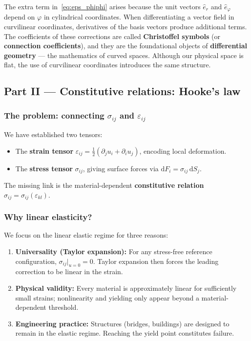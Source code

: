 \begin{remark}
    The extra term in~\eqref{eq:eps_phiphi} arises because the unit vectors $\hat{e}_r$ and $\hat{e}_\varphi$ depend on $\varphi$ in cylindrical coordinates. When differentiating a vector field in curvilinear coordinates, derivatives of the basis vectors produce additional terms. The coefficients of these corrections are called \textbf{Christoffel symbols} (or \textbf{connection coefficients}), and they are the foundational objects of \textbf{differential geometry} — the mathematics of curved spaces. Although our physical space is flat, the use of curvilinear coordinates introduces the same structure.
\end{remark}

\subsection*{Part II — Constitutive relations: Hooke's law}

\subsubsection*{The problem: connecting $\sigma_{ij}$ and $\varepsilon_{ij}$}

We have established two tensors:
\begin{itemize}
    \item The \textbf{strain tensor} $\varepsilon_{ij} = \tfrac{1}{2}(\partial_j u_i + \partial_i u_j)$, encoding local deformation.
    \item The \textbf{stress tensor} $\sigma_{ij}$, giving surface forces via $\mathrm{d}F_i = \sigma_{ij}\,\mathrm{d}S_j$.
\end{itemize}
The missing link is the material-dependent \textbf{constitutive relation} $\sigma_{ij} = \sigma_{ij}(\varepsilon_{kl})$.

\subsubsection*{Why linear elasticity?}

We focus on the linear elastic regime for three reasons:

\begin{enumerate}
    \item \textbf{Universality (Taylor expansion):} For any stress-free reference configuration, $\sigma_{ij}\big|_{u=0}=0$. Taylor expansion then forces the leading correction to be linear in the strain.
    \item \textbf{Physical validity:} Every material is approximately linear for sufficiently small strains; nonlinearity and yielding only appear beyond a material-dependent threshold.
    \item \textbf{Engineering practice:} Structures (bridges, buildings) are designed to remain in the elastic regime. Reaching the yield point constitutes failure.
\end{enumerate}

